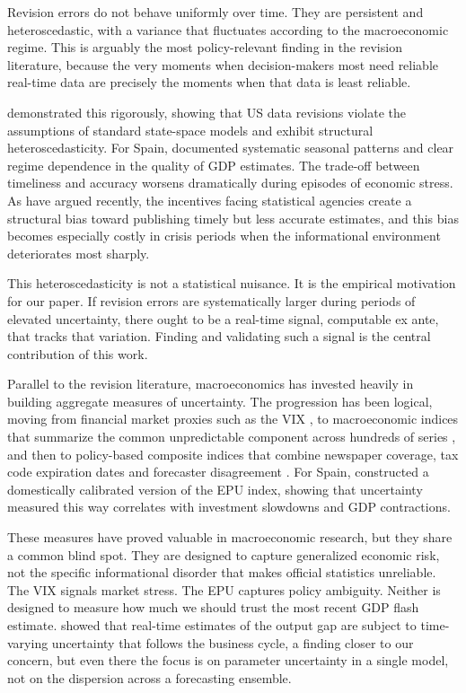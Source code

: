 \documentclass[12pt,a4paper]{article}
\theoremstyle{remark}
\begin{document}
Revision errors do not behave uniformly over time. They are persistent and heteroscedastic, with a variance that fluctuates according to the macroeconomic regime. This is arguably the most policy-relevant finding in the revision literature, because the very moments when decision-makers most need reliable real-time data are precisely the moments when that data is least reliable.

\citet{aruoba2008} demonstrated this rigorously, showing that US data revisions violate the assumptions of standard state-space models and exhibit structural heteroscedasticity. For Spain, \citet{pavia2018} documented systematic seasonal patterns and clear regime dependence in the quality of GDP estimates. The trade-off between timeliness and accuracy worsens dramatically during episodes of economic stress. As \citet{asimakopoulos2023} have argued recently, the incentives facing statistical agencies create a structural bias toward publishing timely but less accurate estimates, and this bias becomes especially costly in crisis periods when the informational environment deteriorates most sharply.

This heteroscedasticity is not a statistical nuisance. It is the empirical motivation for our paper. If revision errors are systematically larger during periods of elevated uncertainty, there ought to be a real-time signal, computable ex ante, that tracks that variation. Finding and validating such a signal is the central contribution of this work.

Parallel to the revision literature, macroeconomics has invested heavily in building aggregate measures of uncertainty. The progression has been logical, moving from financial market proxies such as the VIX \citep{bloomuncer}, to macroeconomic indices that summarize the common unpredictable component across hundreds of series \citep{jurado2015}, and then to policy-based composite indices that combine newspaper coverage, tax code expiration dates and forecaster disagreement \citep{baker2016measuring}. For Spain, \citet{ghirelli2019} constructed a domestically calibrated version of the EPU index, showing that uncertainty measured this way correlates with investment slowdowns and GDP contractions.

These measures have proved valuable in macroeconomic research, but they share a common blind spot. They are designed to capture generalized economic risk, not the specific informational disorder that makes official statistics unreliable. The VIX signals market stress. The EPU captures policy ambiguity. Neither is designed to measure how much we should trust the most recent GDP flash estimate. \citet{berge2020} showed that real-time estimates of the output gap are subject to time-varying uncertainty that follows the business cycle, a finding closer to our concern, but even there the focus is on parameter uncertainty in a single model, not on the dispersion across a forecasting ensemble.
\end{document}
